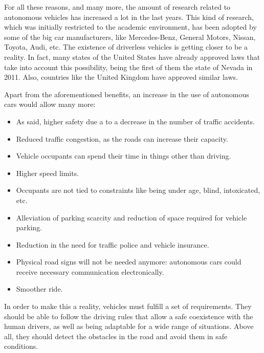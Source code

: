 For all these reasons, and many more, the amount of research related to autonomous vehicles has increased a lot in the last years. This kind of research, which was initially restricted to the academic environment, has been adopted by some of the big car manufacturers, like Mercedes-Benz, General Motors, Nissan, Toyota, Audi, etc. The existence of driverless vehicles is getting closer to be a reality. In fact, many states of the United States have already approved laws that take into account this possibility, being the first of them the state of Nevada in 2011. Also, countries like the United Kingdom have approved similar laws.

Apart from the aforementioned benefits, an increase in the use of autonomous cars would allow many more:
\begin{itemize}
 \item As said, higher safety due a to a decrease in the number of traffic accidents.
 \item Reduced traffic congestion, as the roads can increase their capacity.
 \item Vehicle occupants can spend their time in things other than driving.
 \item Higher speed limits.
 \item Occupants are not tied to constraints like being under age, blind, intoxicated, etc.
 \item Alleviation of parking scarcity and reduction of space required for vehicle parking.
 \item Reduction in the need for traffic police and vehicle insurance.
 \item Physical road signs will not be needed anymore: autonomous cars could receive necessary communication electronically.
 \item Smoother ride.
\end{itemize}

In order to make this a reality, vehicles must fulfill a set of requirements. They should be able to follow the driving rules that allow a safe coexistence with the human drivers, as well as being adaptable for a wide range of situations. Above all, they should detect the obstacles in the road and avoid them in safe conditions. 


